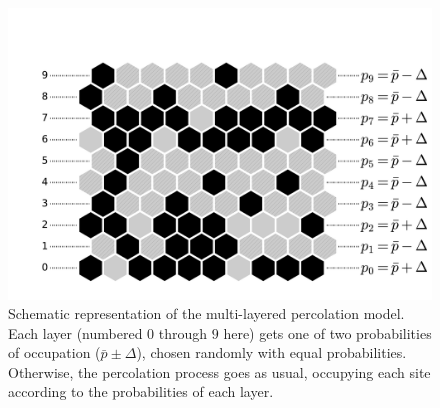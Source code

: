 

\begin{figure}
\begin{center}
    \includegraphics[scale=0.4]{chapters/ch5-anis/figs/mlperco_explain}
\end{center}
\caption{Schematic representation of the multi-layered percolation model. Each
    layer (numbered $0$ through $9$ here) gets one of two probabilities of
    occupation ($\bar{p}\pm\Delta$), chosen randomly with equal probabilities.
    Otherwise, the percolation process goes as usual, occupying each site
    according to the probabilities of each layer.}
\label{fig:mlperco_explain}
\end{figure}

